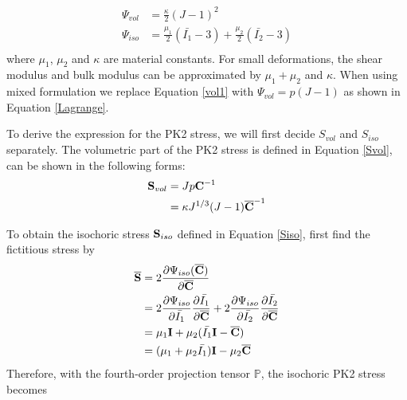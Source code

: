 \begin{subequations}
\label{Mooney}
\begin{align}
\Psi_{vol} &= \frac{\kappa}{2}(J - 1)^2 \label{vol1} \\
\Psi_{iso} &= \frac{\mu_1}{2}(\bar{I_1} - 3) + \frac{\mu_2}{2}(\bar{I_2} - 3) \label{iso1}\\
\end{align}
\end{subequations}
where $\mu_1$, $\mu_2$ and $\kappa$ are material constants. For small deformations, the shear modulus and bulk modulus can be approximated by $\mu_1+\mu_2$ and $\kappa$. When using mixed formulation we replace Equation \ref{vol1} with $\Psi_{vol} = p(J - 1) \label{vol11}$
as shown in Equation \ref{Lagrange}.

To derive the expression for the PK2 stress, we will first decide $S_{vol}$ and $S_{iso}$ separately. The volumetric part of the PK2 stress is defined in Equation \ref{Svol}, can be shown in the following forms:
\begin{subequations}
\label{S1}
\begin{align}
\bold{S}_{vol} &= Jp\bold{C}^{-1} \label{Svol1}\\
		      &= \kappa{J^{1/3}(J-1)}\bold{\overline{C}}^{-1} \label{Svol11}
\end{align}
\end{subequations}

To obtain the isochoric stress $\bold{S}_{iso}$ defined in Equation \ref{Siso}, first find the fictitious stress by
\begin{equation} \label{Sbar1}
\begin{split}
\overline{\bold{S}} &= 2\frac{\partial\Psi_{iso}({\overline{\bold{C}})}}{\partial\overline{\bold{C}}} \\
&= 2\frac{\partial\Psi_{iso}}{\partial\bar{I_1}} \frac{\partial\bar{I_1}}{\partial\overline{\bold{C}}}  + 2\frac{\partial\Psi_{iso}}{\partial\bar{I_2}} \frac{\partial\bar{I_2}}{\partial\overline{\bold{C}}} \\
&= \mu_1{\bold{I}} + \mu_2({\bar{I_1}\bold{I} - \overline{\bold{C}}}) \\
&= (\mu_1+\mu_2\bar{I_1})\bold{I} - \mu_2{\overline{\bold{C}}}
\end{split}
\end{equation}
Therefore, with the fourth-order projection tensor $\mathbb{P}$, the isochoric PK2 stress becomes

